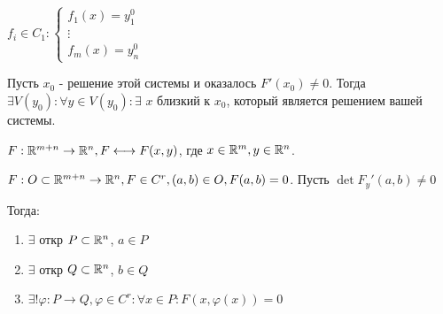 $f_i \in C_1:
\begin{cases}
    f_1(x) = y_1^0\\
    \vdots \\
    f_m(x) = y_n^0
\end{cases}$

Пусть $x_0$ - решение этой системы и оказалось $F'(x_0)\neq 0 $. Тогда $\exists V(y_0): \forall y \in V(y_0): \exists$ $x$ близкий к $x_0$, который является решением вашей системы.

 $F: \mathbb{R}^{m+n}\rightarrow  \mathbb{R}^n, F \longleftrightarrow F(x,y)$, где $x\in \mathbb{R}^m, y\in \mathbb{R}^n$.


$F: O \subset \mathbb{R}^{m+n}
\rightarrow  \mathbb{R}^n, F \in C^r, (a,b)\in O, F(a,b) = 0$. Пусть $\det F_y'(a,b) \neq 0$

Тогда:
\begin{enumerate}
    \item $\exists$ откр $P \subset \mathbb{R}^n$, $a\in P$
    \item $\exists$ откр $Q \subset \mathbb{R}^n$, $b \in Q$
    \item $\exists! \varphi: P\rightarrow Q, \varphi \in C^r: \forall x \in P: F(x,\varphi(x)) = 0$
\end{enumerate}

